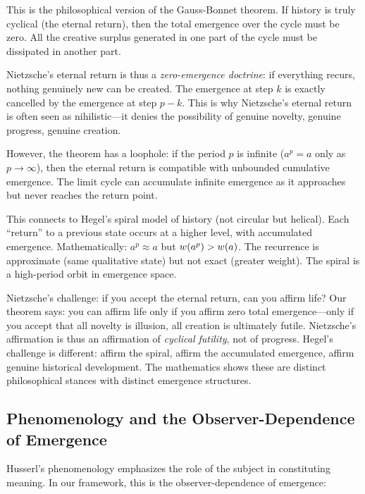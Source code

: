 \begin{interpretation}
This is the philosophical version of the Gauss-Bonnet theorem. If history is
truly cyclical (the eternal return), then the total emergence over the cycle
must be zero. All the creative surplus generated in one part of the cycle must
be dissipated in another part.

Nietzsche's eternal return is thus a \emph{zero-emergence doctrine}: if everything
recurs, nothing genuinely new can be created. The emergence at step $k$ is
exactly cancelled by the emergence at step $p - k$. This is why Nietzsche's
eternal return is often seen as nihilistic---it denies the possibility of genuine
novelty, genuine progress, genuine creation.

However, the theorem has a loophole: if the period $p$ is infinite ($a^p = a$
only as $p \to \infty$), then the eternal return is compatible with unbounded
cumulative emergence. The limit cycle can accumulate infinite emergence as it
approaches but never reaches the return point.

This connects to Hegel's spiral model of history (not circular but helical).
Each ``return'' to a previous state occurs at a higher level, with accumulated
emergence. Mathematically: $a^p \approx a$ but $w(a^p) > w(a)$. The
recurrence is approximate (same qualitative state) but not exact (greater weight).
The spiral is a high-period orbit in emergence space.

Nietzsche's challenge: if you accept the eternal return, can you affirm life?
Our theorem says: you can affirm life only if you affirm zero total emergence---only
if you accept that all novelty is illusion, all creation is ultimately futile.
Nietzsche's affirmation is thus an affirmation of \emph{cyclical futility}, not
of progress. Hegel's challenge is different: affirm the spiral, affirm the
accumulated emergence, affirm genuine historical development. The mathematics
shows these are distinct philosophical stances with distinct emergence structures.
\end{interpretation}

\subsection{Phenomenology and the Observer-Dependence of Emergence}

Husserl's phenomenology emphasizes the role of the subject in constituting
meaning. In our framework, this is the observer-dependence of emergence:

